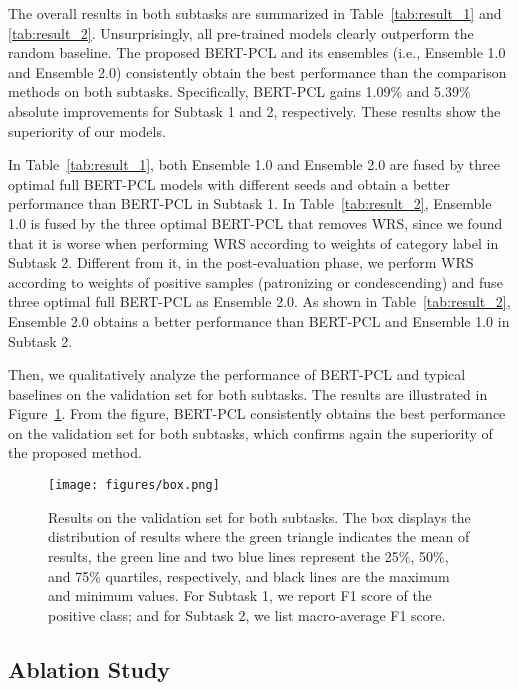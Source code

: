 \documentclass[11pt]{article}
\begin{document}
The overall results in both subtasks are summarized in 
Table~\ref{tab:result_1} and \ref{tab:result_2}.
Unsurprisingly, all pre-trained models clearly outperform the random baseline. 
The proposed BERT-PCL and its ensembles (i.e., Ensemble 1.0 and Ensemble 2.0) consistently obtain the best performance than the comparison methods on both subtasks.
Specifically, BERT-PCL gains 1.09\% and 5.39\% absolute improvements for Subtask 1 and 2, respectively.
These results show the superiority of our models.

In Table~\ref{tab:result_1}, both Ensemble 1.0 and Ensemble 2.0 are fused by three
optimal full BERT-PCL models with different seeds and obtain a better performance than BERT-PCL in Subtask 1.
In Table~\ref{tab:result_2}, Ensemble 1.0 is fused by the three optimal BERT-PCL that removes WRS, since we found that it is worse when performing WRS according to weights of category label in Subtask 2. Different from it, in the post-evaluation phase, we perform WRS according to weights of positive samples (patronizing or condescending) and fuse three optimal full BERT-PCL as Ensemble 2.0. As shown in Table~\ref{tab:result_2}, Ensemble 2.0 obtains a better performance than BERT-PCL and Ensemble 1.0 in Subtask 2.



Then, we qualitatively analyze the performance of BERT-PCL and typical baselines on the validation set for both subtasks.
The results are illustrated in Figure~\ref{fig:dev_kFold}.
From the figure, BERT-PCL consistently obtains the best performance on the validation set for both subtasks, which confirms again the superiority of the proposed method.





\begin{figure}[t]
    \centering
    \texttt{[image: figures/box.png]}
    \caption{Results on the validation set for both subtasks. 
    The box displays the distribution of results where the green triangle indicates the mean of results, the green line and two blue lines represent the 25\%, 50\%, and 75\% quartiles, respectively, and black lines are the maximum and minimum values.
    For Subtask 1, we report F1 score of the positive class; and for Subtask 2, we list macro-average F1 score.
    }
    \label{fig:dev_kFold}
\end{figure}



\subsection{Ablation Study}
\end{document}
